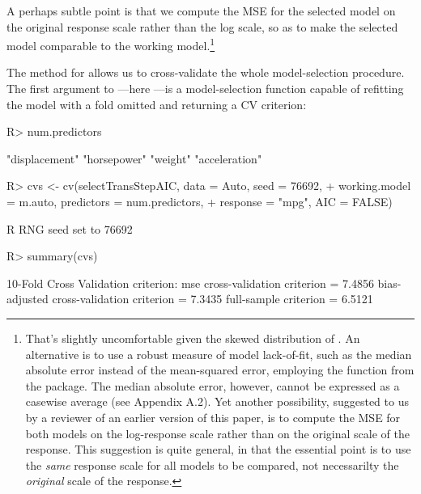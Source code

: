 \documentclass[
]{jss}
\begin{document}
A perhaps subtle point is that we compute the MSE for the selected model
on the original  response scale rather than the log scale, so
as to make the selected model comparable to the working
model.\footnote{That's slightly uncomfortable given the skewed
  distribution of . An alternative is to use a robust measure
  of model lack-of-fit, such as the median absolute error instead of the
  mean-squared error, employing the  function from the
   package. The median absolute error, however, cannot be
  expressed as a casewise average (see Appendix A.2). Yet another
  possibility, suggested to us by a reviewer of an earlier version of
  this paper, is to compute the MSE for both models on the log-response
  scale rather than on the original scale of the response. This
  suggestion is quite general, in that the essential point is to use the
  \emph{same} response scale for all models to be compared, not
  necessarilty the \emph{original} scale of the response.}

The  method for  allows us to cross-validate
the whole model-selection procedure. The first argument to
---here ---is a model-selection
function capable of refitting the model with a fold omitted and
returning a CV criterion:

\begin{CodeChunk}
\begin{CodeInput}
R> num.predictors
\end{CodeInput}
\begin{CodeOutput}
[1] "displacement" "horsepower"   "weight"       "acceleration"
\end{CodeOutput}
\begin{CodeInput}
R> cvs <- cv(selectTransStepAIC, data = Auto, seed = 76692,
+           working.model = m.auto, predictors = num.predictors,
+           response = "mpg", AIC = FALSE)
\end{CodeInput}
\begin{CodeOutput}
R RNG seed set to 76692
\end{CodeOutput}
\begin{CodeInput}
R> summary(cvs)
\end{CodeInput}
\begin{CodeOutput}
10-Fold Cross Validation
criterion: mse
cross-validation criterion = 7.4856
bias-adjusted cross-validation criterion = 7.3435
full-sample criterion = 6.5121
\end{CodeOutput}
\end{CodeChunk}
\end{document}
